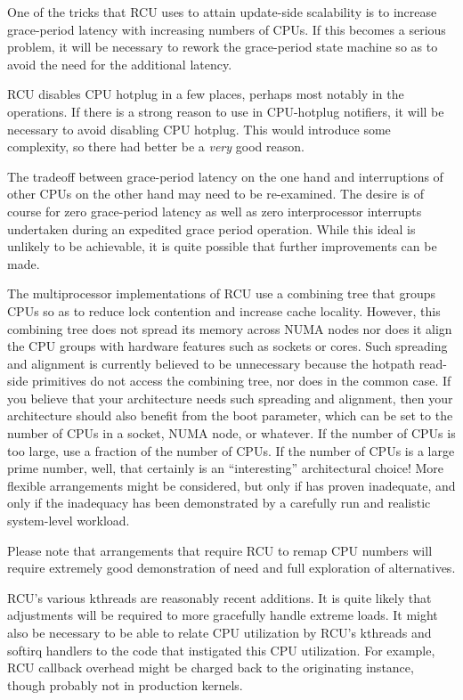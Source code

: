 One of the tricks that RCU uses to attain update-side scalability is to
increase grace-period latency with increasing numbers of CPUs.
If this
becomes a serious problem, it will be necessary to rework the
grace-period state machine so as to avoid the need for the additional
latency.

RCU disables CPU hotplug in a few places, perhaps most notably in the
 operations.
If there is a strong reason to use
 in CPU-hotplug notifiers, it will be necessary to
avoid disabling CPU hotplug.
This would introduce some complexity, so
there had better be a \emph{very} good reason.

The tradeoff between grace-period latency on the one hand and
interruptions of other CPUs on the other hand may need to be
re-examined.
The desire is of course for zero grace-period latency as
well as zero interprocessor interrupts undertaken during an expedited
grace period operation.
While this ideal is unlikely to be achievable,
it is quite possible that further improvements can be made.

The multiprocessor implementations of RCU use a combining tree that
groups CPUs so as to reduce lock contention and increase cache locality.
However, this combining tree does not spread its memory across NUMA
nodes nor does it align the CPU groups with hardware features such as
sockets or cores.
Such spreading and alignment is currently believed to
be unnecessary because the hotpath read-side primitives do not access
the combining tree, nor does  in the common case.
If you
believe that your architecture needs such spreading and alignment, then
your architecture should also benefit from the
 boot parameter, which can be set to the
number of CPUs in a socket, NUMA node, or whatever.
If the number of
CPUs is too large, use a fraction of the number of CPUs.
If the number
of CPUs is a large prime number, well, that certainly is an
``interesting'' architectural choice! More flexible arrangements might be
considered, but only if  has proven
inadequate, and only if the inadequacy has been demonstrated by a
carefully run and realistic system-level workload.

Please note that arrangements that require RCU to remap CPU numbers will
require extremely good demonstration of need and full exploration of
alternatives.

RCU's various kthreads are reasonably recent additions.
It is quite
likely that adjustments will be required to more gracefully handle
extreme loads.
It might also be necessary to be able to relate CPU
utilization by RCU's kthreads and softirq handlers to the code that
instigated this CPU utilization.
For example, RCU callback overhead
might be charged back to the originating  instance, though
probably not in production kernels.

